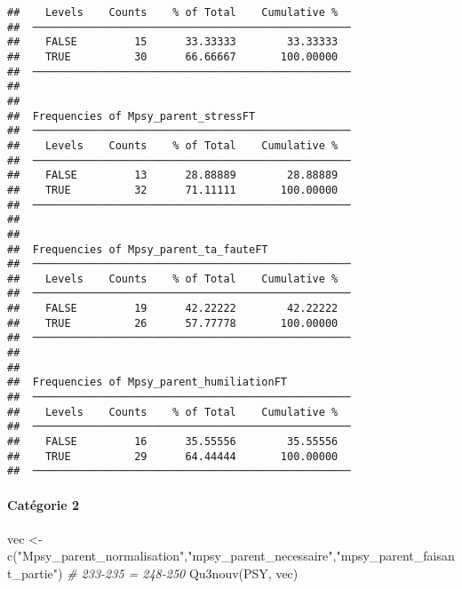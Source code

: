 \documentclass[
]{article}
\newenvironment{Shaded}{\begin{snugshade}}{\end{snugshade}}
\newcommand{\CommentTok}[1]{\textcolor[rgb]{0.56,0.35,0.01}{\textit{#1}}}
\newcommand{\FunctionTok}[1]{\textcolor[rgb]{0.00,0.00,0.00}{#1}}
\newcommand{\NormalTok}[1]{#1}
\newcommand{\OtherTok}[1]{\textcolor[rgb]{0.56,0.35,0.01}{#1}}
\newcommand{\StringTok}[1]{\textcolor[rgb]{0.31,0.60,0.02}{#1}}
\begin{document}
\begin{verbatim}
##    Levels    Counts    % of Total    Cumulative %   
##  ────────────────────────────────────────────────── 
##    FALSE         15      33.33333        33.33333   
##    TRUE          30      66.66667       100.00000   
##  ────────────────────────────────────────────────── 
## 
## 
##  Frequencies of Mpsy_parent_stressFT                
##  ────────────────────────────────────────────────── 
##    Levels    Counts    % of Total    Cumulative %   
##  ────────────────────────────────────────────────── 
##    FALSE         13      28.88889        28.88889   
##    TRUE          32      71.11111       100.00000   
##  ────────────────────────────────────────────────── 
## 
## 
##  Frequencies of Mpsy_parent_ta_fauteFT              
##  ────────────────────────────────────────────────── 
##    Levels    Counts    % of Total    Cumulative %   
##  ────────────────────────────────────────────────── 
##    FALSE         19      42.22222        42.22222   
##    TRUE          26      57.77778       100.00000   
##  ────────────────────────────────────────────────── 
## 
## 
##  Frequencies of Mpsy_parent_humiliationFT           
##  ────────────────────────────────────────────────── 
##    Levels    Counts    % of Total    Cumulative %   
##  ────────────────────────────────────────────────── 
##    FALSE         16      35.55556        35.55556   
##    TRUE          29      64.44444       100.00000   
##  ──────────────────────────────────────────────────
\end{verbatim}

\hypertarget{catuxe9gorie-2-2}{%
\paragraph{Catégorie 2}\label{catuxe9gorie-2-2}}

\begin{Shaded}
\begin{Highlighting}[]
\NormalTok{vec }\OtherTok{\textless{}{-}} \FunctionTok{c}\NormalTok{(}\StringTok{"Mpsy\_parent\_normalisation"}\NormalTok{,}\StringTok{"mpsy\_parent\_necessaire"}\NormalTok{,}\StringTok{"mpsy\_parent\_faisant\_partie"}\NormalTok{)  }\CommentTok{\# 233{-}235 = 248{-}250}
\FunctionTok{Qu3nouv}\NormalTok{(PSY, vec)}
\end{Highlighting}
\end{Shaded}
\end{document}
